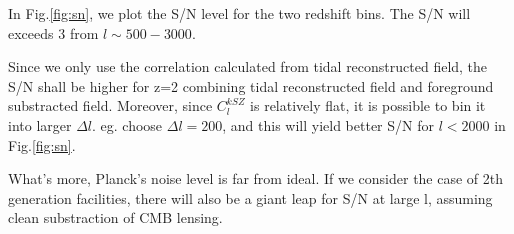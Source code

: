 In Fig.\ref{fig:sn}, we plot the S/N level for the two redshift bins. 
The S/N will exceeds 3 from $l\sim 500-3000$. 

Since we only use the correlation calculated from tidal reconstructed field, the S/N shall be higher for z=2  
combining tidal reconstructed field and foreground substracted field. 
Moreover, since $C_l^{kSZ}$ is relatively flat, 
it is possible to bin it into larger $\Delta l$. 
eg. \cite{Hill16} choose $\Delta l=200$, and this will yield better S/N for $l<2000$ in Fig.\ref{fig:sn}.

What's more, Planck's noise level is far from ideal. If we consider the case of 2th generation facilities, there will also be a giant leap for S/N at large l, 
assuming clean substraction of CMB lensing. 
